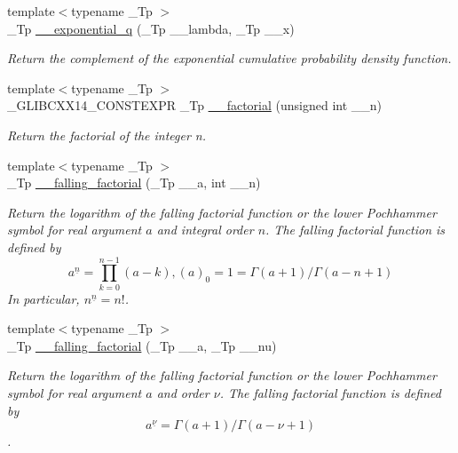 \begin{DoxyCompactItemize}
{\footnotesize template$<$typename \+\_\+\+Tp $>$ }\\\+\_\+\+Tp \hyperlink{namespacestd_1_1____detail_a53b59e7ff7bbe2185cbc153a4a5fd472}{\+\_\+\+\_\+exponential\+\_\+q} (\+\_\+\+Tp \+\_\+\+\_\+lambda, \+\_\+\+Tp \+\_\+\+\_\+x)
\begin{DoxyCompactList}\small\item\em Return the complement of the exponential cumulative probability density function. \end{DoxyCompactList}\item 
{\footnotesize template$<$typename \+\_\+\+Tp $>$ }\\\+\_\+\+G\+L\+I\+B\+C\+X\+X14\+\_\+\+C\+O\+N\+S\+T\+E\+X\+PR \+\_\+\+Tp \hyperlink{namespacestd_1_1____detail_a8de5d6069cbef126684be0800f47f8b2}{\+\_\+\+\_\+factorial} (unsigned int \+\_\+\+\_\+n)
\begin{DoxyCompactList}\small\item\em Return the factorial of the integer n. \end{DoxyCompactList}\item 
{\footnotesize template$<$typename \+\_\+\+Tp $>$ }\\\+\_\+\+Tp \hyperlink{namespacestd_1_1____detail_a62ddf0f8d9467f4c3f2cc0b500ca1272}{\+\_\+\+\_\+falling\+\_\+factorial} (\+\_\+\+Tp \+\_\+\+\_\+a, int \+\_\+\+\_\+n)
\begin{DoxyCompactList}\small\item\em Return the logarithm of the falling factorial function or the lower Pochhammer symbol for real argument $ a $ and integral order $ n $. The falling factorial function is defined by \[ a^{\underline{n}} = \prod_{k=0}^{n-1} (a - k), (a)_0 = 1 = \Gamma(a + 1) / \Gamma(a - n + 1) \] In particular, $ n^{\underline{n}} = n! $. \end{DoxyCompactList}\item 
{\footnotesize template$<$typename \+\_\+\+Tp $>$ }\\\+\_\+\+Tp \hyperlink{namespacestd_1_1____detail_a7cde2bf518e7ea3a0db2bec8f41b6465}{\+\_\+\+\_\+falling\+\_\+factorial} (\+\_\+\+Tp \+\_\+\+\_\+a, \+\_\+\+Tp \+\_\+\+\_\+nu)
\begin{DoxyCompactList}\small\item\em Return the logarithm of the falling factorial function or the lower Pochhammer symbol for real argument $ a $ and order $ \nu $. The falling factorial function is defined by \[ a^{\underline{\nu}} = \Gamma(a + 1) / \Gamma(a - \nu + 1) \]. \end{DoxyCompactList}\item 

\end{DoxyCompactItemize}
